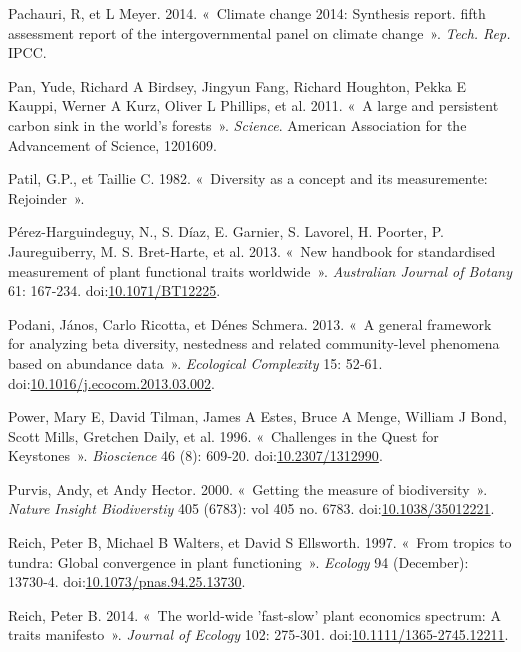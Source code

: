 \documentclass[11pt,french,A4paper,extrafontsizes,onecolumn,openright]{memoir}
\begin{document}
\hypertarget{ref-Pachauri2014}{}
Pachauri, R, et L Meyer. 2014. «~Climate change 2014: Synthesis report.
fifth assessment report of the intergovernmental panel on climate
change~». \emph{Tech. Rep.} IPCC.

\hypertarget{ref-Pan2011}{}
Pan, Yude, Richard A Birdsey, Jingyun Fang, Richard Houghton, Pekka E
Kauppi, Werner A Kurz, Oliver L Phillips, et al. 2011. «~A large and
persistent carbon sink in the world's forests~». \emph{Science}.
American Association for the Advancement of Science, 1201609.

\hypertarget{ref-Patil1982}{}
Patil, G.P., et Taillie C. 1982. «~Diversity as a concept and its
measuremente: Rejoinder~».

\hypertarget{ref-Perez-Harguindeguy2013}{}
Pérez-Harguindeguy, N., S. Díaz, E. Garnier, S. Lavorel, H. Poorter, P.
Jaureguiberry, M. S. Bret-Harte, et al. 2013. «~New handbook for
standardised measurement of plant functional traits worldwide~».
\emph{Australian Journal of Botany} 61: 167‑234.
doi:\href{https://doi.org/10.1071/BT12225}{10.1071/BT12225}.

\hypertarget{ref-Podani2013}{}
Podani, János, Carlo Ricotta, et Dénes Schmera. 2013. «~A general
framework for analyzing beta diversity, nestedness and related
community-level phenomena based on abundance data~». \emph{Ecological
Complexity} 15: 52‑61.
doi:\href{https://doi.org/10.1016/j.ecocom.2013.03.002}{10.1016/j.ecocom.2013.03.002}.

\hypertarget{ref-Power1996}{}
Power, Mary E, David Tilman, James A Estes, Bruce A Menge, William J
Bond, Scott Mills, Gretchen Daily, et al. 1996. «~Challenges in the
Quest for Keystones~». \emph{Bioscience} 46 (8): 609‑20.
doi:\href{https://doi.org/10.2307/1312990}{10.2307/1312990}.

\hypertarget{ref-Purvis2000}{}
Purvis, Andy, et Andy Hector. 2000. «~Getting the measure of
biodiversity~». \emph{Nature Insight Biodiverstiy} 405 (6783): vol 405
no. 6783. doi:\href{https://doi.org/10.1038/35012221}{10.1038/35012221}.

\hypertarget{ref-Reich1997}{}
Reich, Peter B, Michael B Walters, et David S Ellsworth. 1997. «~From
tropics to tundra: Global convergence in plant functioning~».
\emph{Ecology} 94 (December): 13730‑4.
doi:\href{https://doi.org/10.1073/pnas.94.25.13730}{10.1073/pnas.94.25.13730}.

\hypertarget{ref-Reich2014}{}
Reich, Peter B. 2014. «~The world-wide 'fast-slow' plant economics
spectrum: A traits manifesto~». \emph{Journal of Ecology} 102: 275‑301.
doi:\href{https://doi.org/10.1111/1365-2745.12211}{10.1111/1365-2745.12211}.
\end{document}
